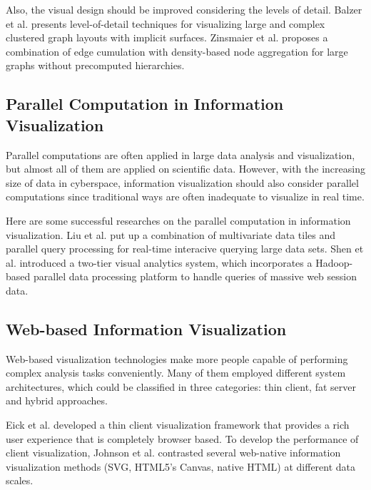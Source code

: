 \documentclass{article}
\begin{document}
Also, the visual design should be improved considering the levels of detail.
Balzer et al.\cite{balzer2007level} presents level-of-detail techniques for visualizing large and complex clustered graph layouts with implicit surfaces.
Zinsmaier et al.\cite{zinsmaier2012interactive} proposes a combination of edge cumulation with density-based node aggregation for large graphs without precomputed hierarchies.


\subsection{Parallel Computation in Information Visualization}

Parallel computations are often applied in large data analysis and visualization, but almost all of them are applied on scientific data. However, with the increasing size of data in cyberspace, information visualization should also consider parallel computations since traditional ways are often inadequate to visualize in real time.

Here are some successful researches on the parallel computation in information visualization.
Liu et al.\cite{liu2013immens} put up a combination of multivariate data tiles and parallel query processing for real-time interacive querying large data sets.
Shen et al.\cite{shen2012visual} introduced a two-tier visual analytics system, which incorporates a Hadoop-based parallel data processing platform to handle queries of massive web session data.

\subsection{Web-based Information Visualization}

Web-based visualization technologies make more people capable of performing complex analysis tasks conveniently. Many of them employed different system architectures, which could be classified in three categories\cite{bostock2009protovis}: thin client, fat server and hybrid approaches.

Eick et al.\cite{eick2007thin} developed a thin client visualization framework that provides a rich user experience that is completely browser based.
To develop the performance of client visualization, Johnson et al.\cite{johnson2008scalability} contrasted several web-native information visualization methods (SVG, HTML5's Canvas, native HTML) at different data scales.
 
\end{document}
